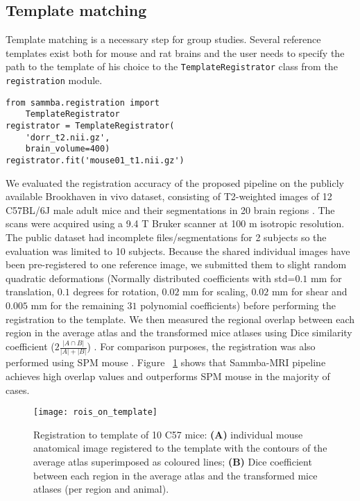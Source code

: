 \documentclass[utf8, a4paper, final, crop]{frontiersSCNS}
\newcommand{\pythoninline}[1]{\texttt{#1}}
\begin{document}
\subsection{Template matching}
Template matching is a necessary step for group studies. Several reference
templates exist both for mouse and rat brains and the user needs to 
specify the path to the template of his choice to the \pythoninline{TemplateRegistrator}
class from the \pythoninline{registration} module.
\begin{verbatim}
from sammba.registration import 
    TemplateRegistrator
registrator = TemplateRegistrator(
    'dorr_t2.nii.gz',
    brain_volume=400)
registrator.fit('mouse01_t1.nii.gz')
\end{verbatim}
We evaluated the registration accuracy of the proposed pipeline  on 
the publicly available Brookhaven in vivo dataset, consisting of 
T2-weighted images of 12 C57BL/6J male adult mice and
their segmentations in 20 brain regions \citep{ma2008vivo}. The scans were 
acquired using a 9.4 T Bruker scanner at 100 \textmu m isotropic resolution. The 
public dataset had incomplete files/segmentations for 2 subjects so the evaluation was 
limited to 10 subjects.
Because the shared individual images have been pre-registered to one reference image, 
we submitted them to slight random quadratic deformations (Normally 
distributed coefficients with std=$0.1$ mm for translation, $0.1$ degrees for 
rotation, $0.02$ mm for scaling, $0.02$ mm for shear and $0.005$ mm for the remaining $31$ polynomial coefficients) before performing the registration to the template.
We then measured the regional overlap
between each region in the average atlas and the transformed mice atlases 
using Dice similarity coefficient ($2\frac{|A \cap B|}{|A| + |B|}$) .
For comparison purposes, the registration was also performed using SPM mouse \citep{sawiak2009spmmouse}.
Figure ~\ref{fig:dices} shows that Sammba-MRI pipeline achieves
high overlap values and outperforms SPM mouse in the majority of cases.
\begin{figure}[h!]
\begin{center}
\texttt{[image: rois\_on\_template]}
\end{center}
\caption{Registration to template of 10 C57 mice: \textbf{(A)} individual mouse anatomical image registered 
to the template with 
the contours of the average atlas superimposed as coloured lines; \textbf{(B)} Dice  
coefficient between each region in the average atlas and the transformed mice atlases 
(per region and animal).}\label{fig:dices}
\end{figure}
\end{document}
